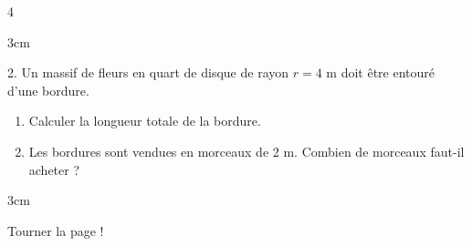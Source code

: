 \documentclass[a4paper]{book}
\begin{document}
{\begin{exerciceNote}{4}
\begin{minipage}{0.8\linewidth}
            \begin{ZoneReponse}{3cm}
            \end{ZoneReponse}
        \end{minipage}
        \hfill
        \begin{minipage}{0.15\linewidth}
        \end{minipage}

        \medskip

        \begin{minipage}{0.8\linewidth}
            2. Un massif de fleurs en quart de disque de rayon $r = 4$ m doit être entouré d'une bordure.
            \begin{enumerate}[leftmargin=*, label=\alph*.]
                \item Calculer la longueur totale de la bordure.
                \item Les bordures sont vendues en morceaux de 2 m. Combien de morceaux faut-il acheter ?
            \end{enumerate}

            \begin{ZoneReponse}{3cm}
            \end{ZoneReponse}
        \end{minipage}
        \hfill
        \begin{minipage}{0.15\linewidth}
        \end{minipage}        
    \end{exerciceNote}


\vfill
\hfill Tourner la page !

}
\end{document}
